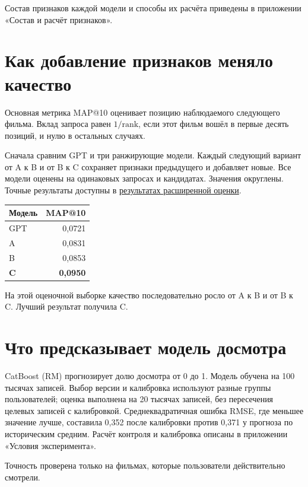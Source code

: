 \documentclass[11pt,a4paper]{article}
\begin{document}
Состав признаков каждой модели и способы их расчёта приведены в приложении «Состав и расчёт признаков».

\section{Как добавление признаков меняло качество}

Основная метрика MAP@10 оценивает позицию наблюдаемого следующего фильма. Вклад запроса равен \(1/\mathrm{rank}\), если этот фильм вошёл в первые десять позиций, и нулю в остальных случаях.

Сначала сравним GPT и три ранжирующие модели. Каждый следующий вариант от A к B и от B к C сохраняет признаки предыдущего и добавляет новые. Все модели оценены на одинаковых запросах и кандидатах. Значения округлены. Точные результаты доступны в \href{https://github.com/suprend/kion-rl-recsys/blob/5c6858e46705fb4baa350d36914905b061376ed3/report-latex/evaluation64k.json}{результатах расширенной оценки}.

\begin{center}
\begin{tabular}{lr}
\toprule
Модель & MAP@10 \\
\midrule
GPT & 0,0721 \\
A & 0,0831 \\
B & 0,0853 \\
\textbf{C} & \textbf{0,0950} \\
\bottomrule
\end{tabular}
\end{center}

На этой оценочной выборке качество последовательно росло от A к B и от B к C. Лучший результат получила C.

\section{Что предсказывает модель досмотра}

CatBoost (RM) прогнозирует долю досмотра от 0 до 1. Модель обучена на 100 тысячах записей. Выбор версии и калибровка используют разные группы пользователей; оценка выполнена на 20 тысячах записей, без пересечения целевых записей с калибровкой. Среднеквадратичная ошибка RMSE, где меньшее значение лучше, составила 0,352 после калибровки против 0,371 у прогноза по историческим средним. Расчёт контроля и калибровка описаны в приложении «Условия эксперимента».

Точность проверена только на фильмах, которые пользователи действительно смотрели.
\end{document}
